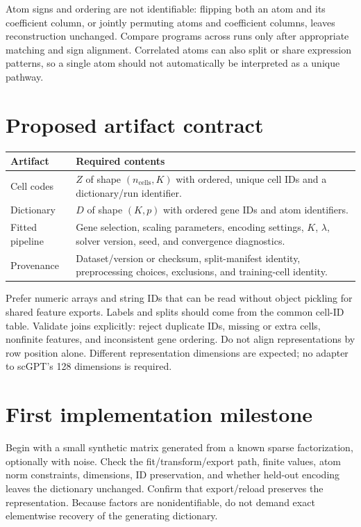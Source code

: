 \documentclass[11pt]{article}
\begin{document}
Atom signs and ordering are not identifiable: flipping both an atom and its coefficient column, or jointly permuting atoms and coefficient columns, leaves reconstruction unchanged. Compare programs across runs only after appropriate matching and sign alignment. Correlated atoms can also split or share expression patterns, so a single atom should not automatically be interpreted as a unique pathway.

\section{Proposed artifact contract}
\begin{center}
\begin{tabular}{p{}p{}}
\toprule
Artifact & Required contents \\
\midrule
Cell codes & $Z$ of shape $(n_{\mathrm{cells}},K)$ with ordered, unique cell IDs and a dictionary/run identifier. \\
Dictionary & $D$ of shape $(K,p)$ with ordered gene IDs and atom identifiers. \\
Fitted pipeline & Gene selection, scaling parameters, encoding settings, $K$, $\lambda$, solver version, seed, and convergence diagnostics. \\
Provenance & Dataset/version or checksum, split-manifest identity, preprocessing choices, exclusions, and training-cell identity. \\
\bottomrule
\end{tabular}
\end{center}

Prefer numeric arrays and string IDs that can be read without object pickling for shared feature exports. Labels and splits should come from the common cell-ID table. Validate joins explicitly: reject duplicate IDs, missing or extra cells, nonfinite features, and inconsistent gene ordering. Do not align representations by row position alone. Different representation dimensions are expected; no adapter to scGPT's 128 dimensions is required.

\section{First implementation milestone}
Begin with a small synthetic matrix generated from a known sparse factorization, optionally with noise. Check the fit/transform/export path, finite values, atom norm constraints, dimensions, ID preservation, and whether held-out encoding leaves the dictionary unchanged. Confirm that export/reload preserves the representation. Because factors are nonidentifiable, do not demand exact elementwise recovery of the generating dictionary.
\end{document}
